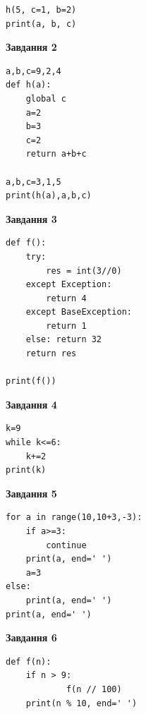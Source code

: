 \documentclass[12pt, ukrainian]{article}
\begin{document}
{{{{{{{{{{{{{{{{\begin{minipage}[t]{7.5cm}
\begin{verbatim}
h(5, c=1, b=2)
print(a, b, c)
\end{verbatim}



\begin{center}
\textbf{Завдання 2}
\end{center}

\begin{verbatim}
a,b,c=9,2,4
def h(a):
    global c
    a=2
    b=3
    c=2
    return a+b+c

a,b,c=3,1,5
print(h(a),a,b,c)
\end{verbatim}



\begin{center}
\textbf{Завдання 3}
\end{center}

\begin{verbatim}
def f():
    try:
        res = int(3//0)
    except Exception: 
        return 4
    except BaseException: 
        return 1
    else: return 32
    return res

print(f())
\end{verbatim}



\begin{center}
\textbf{Завдання 4}
\end{center}

\begin{verbatim}
k=9
while k<=6:
    k+=2
print(k)
\end{verbatim}

\end{minipage}
\vline \hspace{6mm}
\begin{minipage}[t]{10.5cm}

\begin{center}
\textbf{Завдання 5}
\end{center}

\begin{verbatim}
for a in range(10,10+3,-3):
    if a>=3:
        continue
    print(a, end=' ')
    a=3
else:
    print(a, end=' ')
print(a, end=' ')
\end{verbatim}



\begin{center}
\textbf{Завдання 6}
\end{center}

\begin{verbatim}
def f(n):
    if n > 9:
            f(n // 100)
    print(n % 10, end=' ')
    


\end{verbatim}
\end{minipage}}}}}}}}}}}}}}}}}
\end{document}
